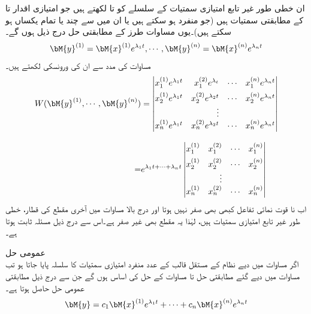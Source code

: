 ان خطی طور غیر تابع امتیازی سمتیات کے سلسلے کو  تا  لکھتے ہیں جو امتیازی اقدار  تا  کے مطابقتی سمتیات ہیں (جو منفرد ہو سکتے ہیں یا ان میں سے چند یا تمام یکساں ہو سکتے ہیں)۔یوں مساوات  طرز کے مطابقتی حل درج ذیل ہوں  گے۔
\begin{align}\label{مساوات_نظام_مستقل_عددی_سر_نظام_ت}
\bM{y}^{(1)}=\bM{x}^{(1)}e^{\lambda_1 t}, \cdots, \bM{y}^{(n)}=\bM{x}^{(n)}e^{\lambda_n t}
\end{align}
مساوات  کی مدد سے ان کی ورونسکی  لکھتے ہیں۔
\begin{gather}\label{مساوات_نظام_مستقل_عددی_سر_نظام_ٹ}
\begin{aligned}
W(\bM{y}^{(1)},\cdots,\bM{y}^{(n)})&=
\begin{vmatrix*}[r]
x_1^{(1)} e^{\lambda_1 t}& x_1^{(2)} e^{\lambda_ t} &\cdots&x_1^{(n)} e^{\lambda_n t}\\[1ex]
x_2^{(1)} e^{\lambda_1 t}& x_2^{(2)} e^{\lambda_2 t} &\cdots&x_2^{(n)} e^{\lambda_n t}\\
& \vdots & &\\
x_n^{(1)} e^{\lambda_1 t}& x_n^{(2)}  e^{\lambda_2 t}&\cdots&x_n^{(n)} e^{\lambda_n t}
\end{vmatrix*}\\[2ex]
=&e^{\lambda_1t+ \cdots+\lambda_n t}
\begin{vmatrix*}[r]
x_1^{(1)}& x_1^{(2)} &\cdots&x_1^{(n)} \\[1ex]
x_2^{(1)} & x_2^{(2)}  &\cdots&x_2^{(n)} \\
& \vdots & &\\
x_n^{(1)} & x_n^{(2)} &\cdots&x_n^{(n)} 
\end{vmatrix*}
\end{aligned}
\end{gather}
اب نا قوت نمائی تفاعل کبھی بھی صفر نہیں ہوتا اور درج بالا مساوات میں آخری مقطع کی قطار، خطی طور غیر تابع امتیازی سمتیات ہیں، لہٰذا یہ مقطع بھی غیر صفر ہے۔اس سے درج ذیل مسئلہ ثابت ہوتا ہے۔

\quad عمومی حل\\
اگر  مساوات  میں دیے نظام کے مستقل قالب  کے  عدد منفرد امتیازی سمتیات کا سلسلہ پایا جاتا ہو تب مساوات  میں دیے گئے مطابقتی حل  تا  مساوات  کے حل کی اساس ہوں گے جن سے درج ذیل مطابقتی عمومی حل حاصل ہوتا ہے۔
\begin{align}
\bM{y}=c_1\bM{x}^{(1)}e^{\lambda_1 t}+\cdots+c_n\bM{x}^{(n)}e^{\lambda_n t}
\end{align} 

